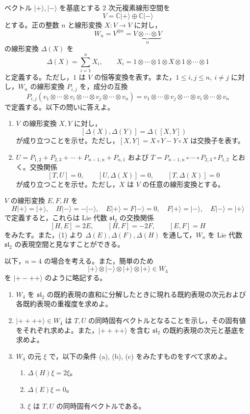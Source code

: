 \documentclass[12pt]{jlreq}
\newcommand{\C}{\mathbb{C}}
\begin{document}
ベクトル \(\lvert+\rangle,\lvert-\rangle\) を基底とする \(2\) 次元複素線形空間を
\[
  V=\C\lvert+\rangle\oplus\C\lvert-\rangle
\]
とする。正の整数 \(n\) と線形変換 \(X:V\to V\) に対し，
\[
  W_n=V^{\otimes n}=\underbrace{V\otimes\cdots\otimes V}_{n}
\]
の線形変換 \(\Delta(X)\) を
\[
  \Delta(X)=\sum_{i=1}^{n}X_i,\qquad
  X_i=1\otimes\cdots\otimes1\otimes X\otimes1\otimes\cdots\otimes1
\]
と定義する。ただし，\(1\) は \(V\) の恒等変換を表す。また，\(1\le i,j\le n,\ i\ne j\) に対し，\(W_n\) の線形変換 \(P_{i,j}\) を，成分の互換
\[
  P_{i,j}(v_1\otimes\cdots\otimes v_i\otimes\cdots\otimes v_j\otimes\cdots\otimes v_n)
  =
  v_1\otimes\cdots\otimes v_j\otimes\cdots\otimes v_i\otimes\cdots\otimes v_n
\]
で定義する。以下の問いに答えよ。

\begin{enumerate}
  \item \(V\) の線形変換 \(X,Y\) に対し，
  \[
    [\Delta(X),\Delta(Y)]=\Delta([X,Y])
  \]
  が成り立つことを示せ。ただし，\([X,Y]=X\circ Y-Y\circ X\) は交換子を表す。
  \item \(U=P_{1,2}+P_{2,3}+\cdots+P_{n-1,n}+P_{n,1}\) および \(T=P_{n-1,n}\circ\cdots\circ P_{2,3}\circ P_{1,2}\) とおく。交換関係
  \[
    [T,U]=0,\qquad [U,\Delta(X)]=0,\qquad [T,\Delta(X)]=0
  \]
  が成り立つことを示せ。ただし，\(X\) は \(V\) の任意の線形変換とする。
\end{enumerate}

\(V\) の線形変換 \(E,F,H\) を
\[
  H\lvert+\rangle=\lvert+\rangle,\quad
  H\lvert-\rangle=-\lvert-\rangle,\quad
  E\lvert+\rangle=F\lvert-\rangle=0,\quad
  F\lvert+\rangle=\lvert-\rangle,\quad
  E\lvert-\rangle=\lvert+\rangle
\]
で定義すると，これらは Lie 代数 \(\mathfrak{sl}_2\) の交換関係
\[
  [H,E]=2E,\qquad [H,F]=-2F,\qquad [E,F]=H
\]
をみたす。また，(1) より \(\Delta(E),\Delta(F),\Delta(H)\) を通して，\(W_n\) を Lie 代数 \(\mathfrak{sl}_2\) の表現空間と見なすことができる。

以下，\(n=4\) の場合を考える。また，簡単のため
\[
  \lvert+\rangle\otimes\lvert-\rangle\otimes\lvert+\rangle\otimes\lvert+\rangle\in W_4
\]
を \(\lvert+-++\rangle\) のように略記する。

\begin{enumerate}
  \item[(3)] \(W_4\) を \(\mathfrak{sl}_2\) の既約表現の直和に分解したときに現れる既約表現の次元および各既約表現の重複度を求めよ。
  \item[(4)] \(\lvert++++\rangle\in W_4\) は \(T,U\) の同時固有ベクトルとなることを示し，その固有値をそれぞれ求めよ。また，\(\lvert++++\rangle\) を含む \(\mathfrak{sl}_2\) の既約表現の次元と基底を求めよ。
  \item[(5)] \(W_4\) の元 \(\xi\) で，以下の条件 (a), (b), (c) をみたすものをすべて求めよ。
  \begin{enumerate}
    \item \(\Delta(H)\xi=2\xi\)。
    \item \(\Delta(E)\xi=0\)。
    \item \(\xi\) は \(T,U\) の同時固有ベクトルである。
  \end{enumerate}
\end{enumerate}
\end{document}
